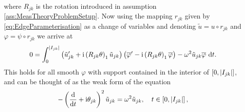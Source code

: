 where $R_{jk}$ is the rotation introduced in assumption \ref{ass:MeasTheoryProblemSetup}.
Now using the mapping $r_{jk}$ given by \eqref{eq:EdgeParameterisation} as a change of variables and denoting $\tilde{u} = u \circ r_{jk}$ and $\varphi = \psi\circ r_{jk}$ we arrive at
\begin{align*}
	0 &= \int_{0}^{\left\lvert I_{jk} \right\rvert} \left( \tilde{u}_{jk}' + \mathrm{i}\left( R_{jk}\theta \right)_1 \tilde{u}_{jk} \right)\left( \overline{\varphi}' - \mathrm{i}\left( R_{jk}\theta \right)_1 \overline{\varphi}  \right) - \omega^2 \tilde{u}_{jk}\overline{\varphi} \ \mathrm{d} t .
\end{align*}
This holds for all smooth $\varphi$ with support contained in the interior of $\left[ 0,\left\lvert I_{jk} \right\rvert \right]$, and can be thought of as the weak form of the equation
\begin{align*}
	-\left( \dfrac{\mathrm{d}}{\mathrm{d}t} + \mathrm{i}\theta_{jk} \right)^2 \tilde{u}_{jk} &= \omega^2 \tilde{u}_{jk}, \quad t\in\left[ 0,\left\lvert I_{jk} \right\rvert \right],
\end{align*}

